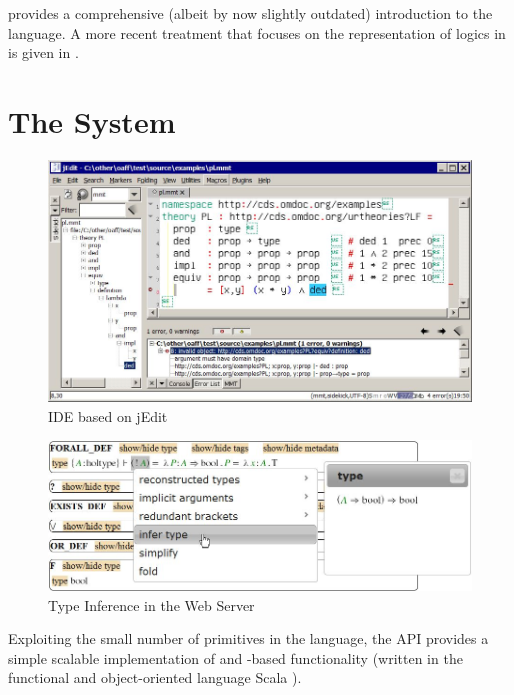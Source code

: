 \cite{RK:mmt:10} provides a comprehensive (albeit by now slightly outdated) introduction to the \mmt language.
A more recent treatment that focuses on the representation of logics in \mmt is given in \cite{rabe:howto:14}.

\section{The \mmt System}\label{sec:mmtsys}

\begin{figure}[htb]
\begin{center}
\includegraphics[width=\textwidth]{img/jedit-sidebar-errors.jpg}
\end{center}
\caption{\mmt IDE based on jEdit}\label{fig:jedit}
\end{figure}

\begin{figure}[htb]
\begin{center}
\includegraphics[width=\textwidth]{img/type-inference.jpg}
\end{center}
\caption{Type Inference in the \mmt Web Server}\label{fig:web}
\end{figure}

Exploiting the small number of primitives in the {\mmt} language, the {\mmt} API provides a simple scalable implementation of {\mmt} and {\mmt}-based functionality (written in the functional and object-oriented language Scala \cite{scala}).

